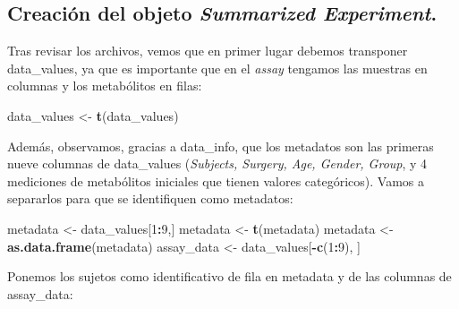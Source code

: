 \documentclass[
]{article}
\newenvironment{Shaded}{\begin{snugshade}}{\end{snugshade}}
\newcommand{\DecValTok}[1]{\textcolor[rgb]{0.00,0.00,0.81}{#1}}
\newcommand{\FunctionTok}[1]{\textcolor[rgb]{0.13,0.29,0.53}{\textbf{#1}}}
\newcommand{\NormalTok}[1]{#1}
\newcommand{\OtherTok}[1]{\textcolor[rgb]{0.56,0.35,0.01}{#1}}
\newcommand{\SpecialCharTok}[1]{\textcolor[rgb]{0.81,0.36,0.00}{\textbf{#1}}}
\begin{document}
\subsection{\texorpdfstring{Creación del objeto \emph{Summarized
Experiment}.}{Creación del objeto Summarized Experiment.}}\label{creaciuxf3n-del-objeto-summarized-experiment.}

Tras revisar los archivos, vemos que en primer lugar debemos transponer
data\_values, ya que es importante que en el \emph{assay} tengamos las
muestras en columnas y los metabólitos en filas:

\begin{Shaded}
\begin{Highlighting}[]
\NormalTok{data\_values }\OtherTok{\textless{}{-}} \FunctionTok{t}\NormalTok{(data\_values)}
\end{Highlighting}
\end{Shaded}

Además, observamos, gracias a data\_info, que los metadatos son las
primeras nueve columnas de data\_values (\emph{Subjects, Surgery, Age,
Gender, Group}, y 4 mediciones de metabólitos iniciales que tienen
valores categóricos). Vamos a separarlos para que se identifiquen como
metadatos:

\begin{Shaded}
\begin{Highlighting}[]
\NormalTok{metadata }\OtherTok{\textless{}{-}}\NormalTok{ data\_values[}\DecValTok{1}\SpecialCharTok{:}\DecValTok{9}\NormalTok{,]}
\NormalTok{metadata }\OtherTok{\textless{}{-}} \FunctionTok{t}\NormalTok{(metadata)}
\NormalTok{metadata }\OtherTok{\textless{}{-}} \FunctionTok{as.data.frame}\NormalTok{(metadata)}
\NormalTok{assay\_data }\OtherTok{\textless{}{-}}\NormalTok{ data\_values[}\SpecialCharTok{{-}}\FunctionTok{c}\NormalTok{(}\DecValTok{1}\SpecialCharTok{:}\DecValTok{9}\NormalTok{), ]}
\end{Highlighting}
\end{Shaded}

Ponemos los sujetos como identificativo de fila en metadata y de las
columnas de assay\_data:

\begin{Shaded}
\end{Shaded}
\end{document}
